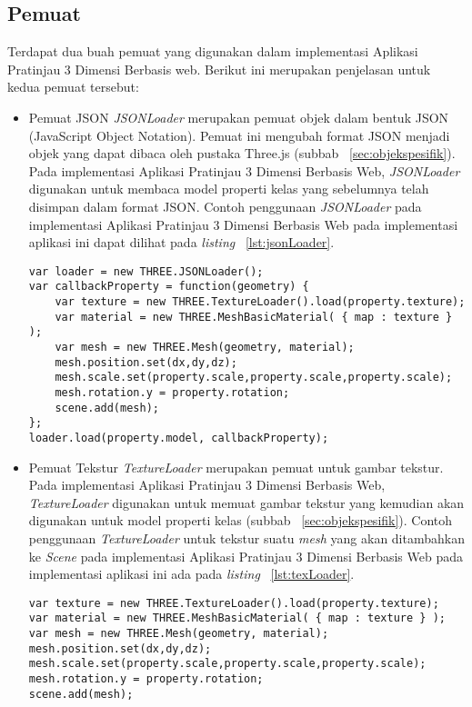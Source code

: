 \subsection{Pemuat}
Terdapat dua buah pemuat yang digunakan dalam implementasi Aplikasi Pratinjau 3 Dimensi Berbasis web. Berikut ini merupakan penjelasan untuk kedua pemuat tersebut:
\begin{itemize}
	\item {Pemuat JSON}
{\it JSONLoader} merupakan pemuat objek dalam bentuk JSON (JavaScript Object Notation). Pemuat ini mengubah format JSON menjadi objek yang dapat dibaca oleh pustaka Three.js (subbab ~\ref{sec:objekspesifik}). Pada implementasi Aplikasi Pratinjau 3 Dimensi Berbasis Web, {\it JSONLoader} digunakan untuk membaca model properti kelas yang sebelumnya telah disimpan dalam format JSON. Contoh penggunaan {\it JSONLoader} pada implementasi Aplikasi Pratinjau 3 Dimensi Berbasis Web pada implementasi aplikasi ini dapat dilihat pada {\it listing} ~\ref{lst:jsonLoader}.
\begin{lstlisting}[caption={Contoh penggunaan {\it JSONLoader}}, label={lst:jsonLoader},captionpos=b]
var loader = new THREE.JSONLoader();
var callbackProperty = function(geometry) {
	var texture = new THREE.TextureLoader().load(property.texture);
	var material = new THREE.MeshBasicMaterial( { map : texture } ); 
	var mesh = new THREE.Mesh(geometry, material);
	mesh.position.set(dx,dy,dz);
	mesh.scale.set(property.scale,property.scale,property.scale);
	mesh.rotation.y = property.rotation;
	scene.add(mesh);
};
loader.load(property.model, callbackProperty);
\end{lstlisting}

	\item {Pemuat Tekstur}
{\it TextureLoader} merupakan pemuat untuk gambar tekstur. Pada implementasi Aplikasi Pratinjau 3 Dimensi Berbasis Web, {\it TextureLoader} digunakan untuk memuat gambar tekstur yang kemudian akan digunakan untuk model properti kelas (subbab ~\ref{sec:objekspesifik}). Contoh penggunaan {\it TextureLoader} untuk tekstur suatu {\it mesh} yang akan ditambahkan ke {\it Scene} pada implementasi Aplikasi Pratinjau 3 Dimensi Berbasis Web pada implementasi aplikasi ini ada pada {\it listing} ~\ref{lst:texLoader}.
\begin{lstlisting}[caption={Contoh penggunaan {\it TextureLoader}}, label={lst:texLoader},captionpos=b]
var texture = new THREE.TextureLoader().load(property.texture);
var material = new THREE.MeshBasicMaterial( { map : texture } ); 
var mesh = new THREE.Mesh(geometry, material);
mesh.position.set(dx,dy,dz);
mesh.scale.set(property.scale,property.scale,property.scale);
mesh.rotation.y = property.rotation;
scene.add(mesh);
\end{lstlisting}
\end{itemize}

